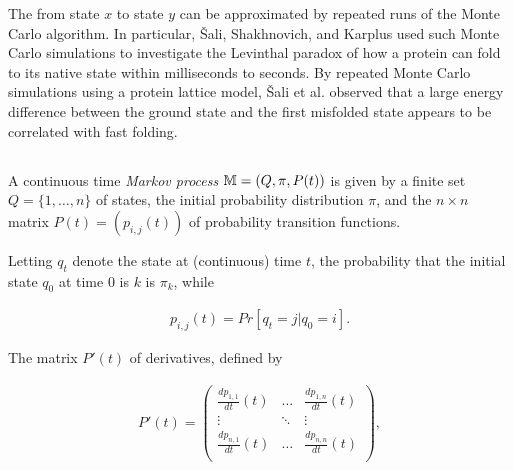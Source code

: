 The \mfpt from state $x$ to state $y$ can
be approximated by repeated runs of the Monte Carlo algorithm.
In particular, \v{S}ali, Shakhnovich, and Karplus used such Monte Carlo
simulations to investigate the Levinthal paradox of how a protein
can fold to its native state within milliseconds to seconds.
By repeated Monte Carlo simulations using a protein lattice model,
\v{S}ali et al. observed that a large energy difference between
the ground state
and the first misfolded state appears to be correlated with fast folding.

\subsection{\Eqt}
\label{subsec:hermes:eq}

A continuous time {\em Markov process} $\mathbb{M}=(Q,\pi,P(t))$
is given by a finite set $Q= \{1,\dots,n\}$ of states, the
initial probability distribution $\pi$,
and the $n\times n$ matrix $P(t)=(p_{i,j}(t))$ of
probability transition functions.


Letting $q_t$ denote the state at (continuous)
time $t$, the probability that the initial state $q_0$ at time 0 is
$k$ is $\pi_k$, while

\begin{align}
\label{eq:hermes:markovProcess}
p_{i,j}(t) = Pr[q_{t} = j| q_0 = i].
\end{align}

The matrix $P'(t)$ of derivatives, defined by

\begin{align}
  P'(t) = \left(
\begin{array}{ccc}
\frac{d p_{1,1}}{d t}(t) & \dots  & \frac{d p_{1,n}}{d t}(t)\\
\vdots & \ddots & \vdots \\
 \frac{d p_{n,1}}{d t}(t) & \dots  & \frac{d p_{n,n}}{d t}(t)\\
\end{array}
\right),
\end{align}

